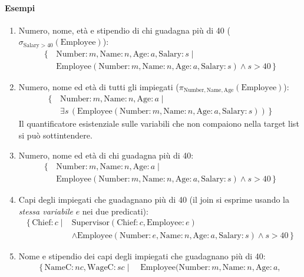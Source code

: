 \documentclass[a4paper,12pt]{article}
\begin{document}
\paragraph{Esempi}
\begin{enumerate}
  \item[0a.] Numero, nome, età e stipendio di chi guadagna più di 40
    ($\sigma_{\text{Salary} > 40}(\text{Employee})$):
    \begin{align*}
      \{\, & \text{Number}: m, \text{Name}: n, \text{Age}: a, \text{Salary}: s
        \mid\\
      & \text{Employee}(\text{Number}: m, \text{Name}: n, \text{Age}: a, \text{Salary}: s) \wedge s > 40 \,\}
    \end{align*}
  \item[0b.] Numero, nome ed età di tutti gli impiegati
    ($\pi_{\text{Number},\text{Name},\text{Age}}(\text{Employee})$):
    \begin{align*}
      \{\, & \text{Number}: m, \text{Name}: n, \text{Age}: a \mid\\
      & \exists s\,(\text{Employee}(\text{Number}: m, \text{Name}: n, \text{Age}: a, \text{Salary}: s)) \,\}
    \end{align*}
    Il quantificatore esistenziale sulle variabili che non compaiono nella
    target list si può sottintendere.
  \item[1.] Numero, nome ed età di chi guadagna più di 40:
    \begin{align*}
      \{\, & \text{Number}: m, \text{Name}: n, \text{Age}: a \mid\\
      & \text{Employee}(\text{Number}: m, \text{Name}: n, \text{Age}: a, \text{Salary}: s) \wedge s > 40 \,\}
    \end{align*}
  \item[2.] Capi degli impiegati che guadagnano più di 40 (il join si esprime
    usando la \emph{stessa variabile} $e$ nei due predicati):
    \begin{align*}
      \{\, \text{Chief}: c \mid{}
      & \text{Supervisor}(\text{Chief}: c, \text{Employee}: e)\\
      & \wedge \text{Employee}(\text{Number}: e, \text{Name}: n, \text{Age}: a, \text{Salary}: s) \wedge s > 40 \,\}
    \end{align*}
  \item[3.] Nome e stipendio dei capi degli impiegati che guadagnano più
    di 40:
    \begin{align*}
      \{\, \text{NameC}: nc, \text{WageC}: sc \mid\;
      & \text{Employee}(\text{Number}: m, \text{Name}: n, \text{Age}: a,

\end{align*}
\end{enumerate}
\end{document}
